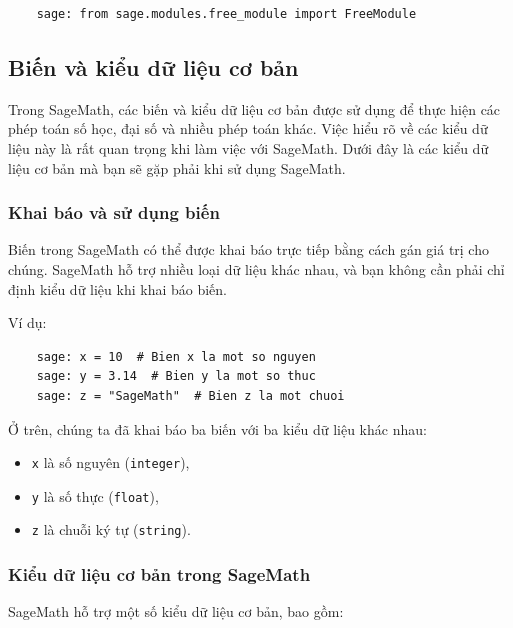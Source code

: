 \begin{lstlisting}
	sage: from sage.modules.free_module import FreeModule
\end{lstlisting}


\subsection{Biến và kiểu dữ liệu cơ bản}

Trong SageMath, các biến và kiểu dữ liệu cơ bản được sử dụng để thực hiện các phép toán số học, đại số và nhiều phép toán khác. Việc hiểu rõ về các kiểu dữ liệu này là rất quan trọng khi làm việc với SageMath. Dưới đây là các kiểu dữ liệu cơ bản mà bạn sẽ gặp phải khi sử dụng SageMath.

\subsubsection{Khai báo và sử dụng biến}

Biến trong SageMath có thể được khai báo trực tiếp bằng cách gán giá trị cho chúng. SageMath hỗ trợ nhiều loại dữ liệu khác nhau, và bạn không cần phải chỉ định kiểu dữ liệu khi khai báo biến.

Ví dụ:

\begin{lstlisting}
	sage: x = 10  # Bien x la mot so nguyen
	sage: y = 3.14  # Bien y la mot so thuc
	sage: z = "SageMath"  # Bien z la mot chuoi
\end{lstlisting}

Ở trên, chúng ta đã khai báo ba biến với ba kiểu dữ liệu khác nhau:
\begin{itemize}
	\item \texttt{x} là số nguyên (\texttt{integer}),
	\item \texttt{y} là số thực (\texttt{float}),
	\item \texttt{z} là chuỗi ký tự (\texttt{string}).
\end{itemize}
\subsubsection{Kiểu dữ liệu cơ bản trong SageMath}

SageMath hỗ trợ một số kiểu dữ liệu cơ bản, bao gồm:

